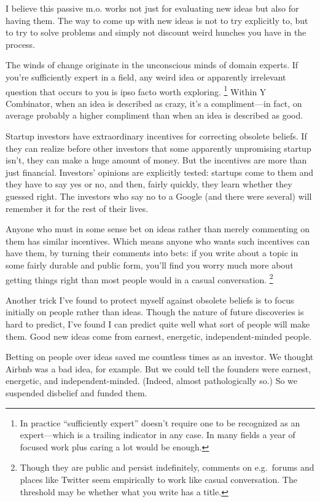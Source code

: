 \documentclass[12pt]{book}
\begin{document}
I believe this passive m.o. works not just for evaluating new ideas but
also for having them. The way to come up with new ideas is not to try
explicitly to, but to try to solve problems and simply not discount
weird hunches you have in the process.

The winds of change originate in the unconscious minds of domain
experts. If you're sufficiently expert in a field, any weird idea or
apparently irrelevant question that occurs to you is ipso facto worth
exploring. \footnote{In practice ``sufficiently expert'' doesn't require one to be
recognized as an expert---which is a trailing indicator in any case. In
many fields a year of focused work plus caring a lot would be enough.} Within Y Combinator, when an idea is
described as crazy, it's a compliment---in fact, on average probably a
higher compliment than when an idea is described as good.

Startup investors have extraordinary incentives for correcting obsolete
beliefs. If they can realize before other investors that some apparently
unpromising startup isn't, they can make a huge amount of money. But the
incentives are more than just financial. Investors' opinions are
explicitly tested: startups come to them and they have to say yes or no,
and then, fairly quickly, they learn whether they guessed right. The
investors who say no to a Google (and there were several) will remember
it for the rest of their lives.

Anyone who must in some sense bet on ideas rather than merely commenting
on them has similar incentives. Which means anyone who wants such
incentives can have them, by turning their comments into bets: if you
write about a topic in some fairly durable and public form, you'll find
you worry much more about getting things right than most people would in
a casual conversation. \footnote{Though they are public and persist indefinitely, comments on
e.g.~forums and places like Twitter seem empirically to work like casual
conversation. The threshold may be whether what you write has a title.}

Another trick I've found to protect myself against obsolete beliefs is
to focus initially on people rather than ideas. Though the nature of
future discoveries is hard to predict, I've found I can predict quite
well what sort of people will make them. Good new ideas come from
earnest, energetic, independent-minded people.

Betting on people over ideas saved me countless times as an investor. We
thought Airbnb was a bad idea, for example. But we could tell the
founders were earnest, energetic, and independent-minded. (Indeed,
almost pathologically so.) So we suspended disbelief and funded them.
\end{document}
